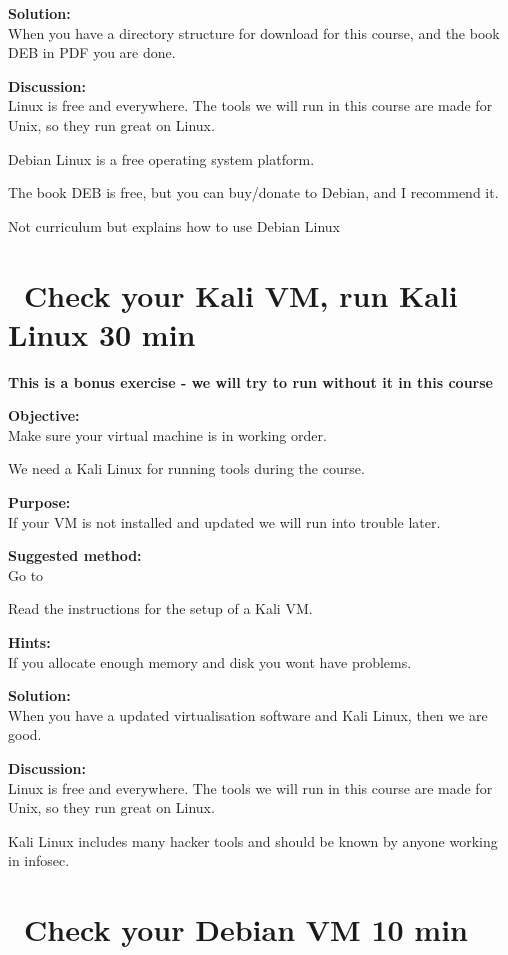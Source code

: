 \documentclass[a4paper,11pt,notitlepage]{report}
\begin{document}
{\bf Solution:}\\
When you have a directory structure for download for this course, and the book DEB in PDF you are done.

{\bf Discussion:}\\
Linux is free and everywhere. The tools we will run in this course are made for Unix, so they run great on Linux.

Debian Linux is a free operating system platform.

The book DEB is free, but you can buy/donate to Debian, and I recommend it.

Not curriculum but explains how to use Debian Linux


\chapter{\faInfoCircle\ Check your Kali VM, run Kali Linux 30 min}
\label{ex:sw-basicVM}


{\Large \bf This is a bonus exercise - we will try to run without it in this course}

{\bf Objective:}\\
Make sure your virtual machine is in working order.

We need a Kali Linux for running tools during the course.

{\bf Purpose:}\\
If your VM is not installed and updated we will run into trouble later.

{\bf Suggested method:}\\
Go to 

Read the instructions for the setup of a Kali VM.

{\bf Hints:}\\
If you allocate enough memory and disk you wont have problems.

{\bf Solution:}\\
When you have a updated virtualisation software and Kali Linux, then we are good.

{\bf Discussion:}\\
Linux is free and everywhere. The tools we will run in this course are made for Unix, so they run great on Linux.

Kali Linux includes many hacker tools and should be known by anyone working in infosec.

\chapter{\faInfoCircle\ Check your Debian VM 10 min}
\label{ex:sw-basicDebianVM}
\end{document}
